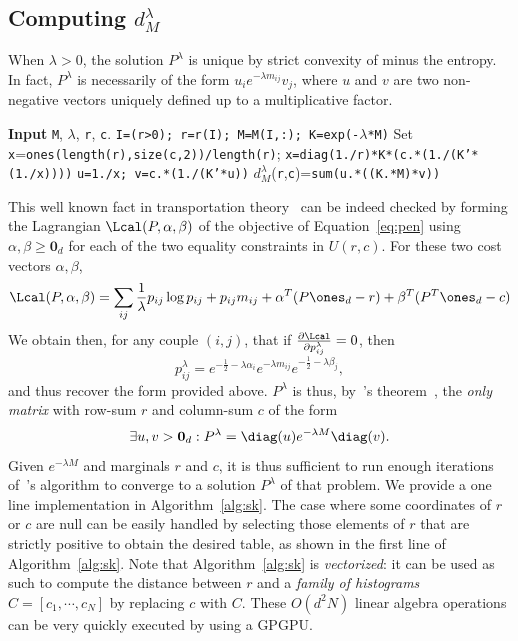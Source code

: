 \documentclass{amsart} %
\begin{document}
\subsection{Computing $d_{M}^\lambda$} When $\lambda>0$, the solution $P^\lambda$ is unique by strict convexity of minus the entropy. In fact, $P^\lambda$ is necessarily of the form $u_i e^{-\lambda m_{ij}} v_j$, where $u$ and $v$ are two non-negative vectors uniquely defined up to a multiplicative factor. 
\begin{algorithm}[H]
        \begin{algorithmic}
	\caption{Computation of $d^\lambda_M(r,c)$ using Sinkhorn-Knopp's fixed point iteration}\label{alg:sk}
          \STATE \textbf{Input} \texttt{M}, $\lambda$, \texttt{r}, \texttt{c}.
		  \STATE \texttt{I=(r>0); r=r(I); M=M(I,:); \texttt{K=exp(-$\lambda$*M)}}
		  \STATE Set \texttt{x}=\texttt{ones(length(r),size(c,2))/length(r)};
		  \STATE \texttt{x=diag(1./r)*K*(c.*(1./(K'*(1./x))))}
		  \ENDWHILE
		  \STATE  \texttt{u=1./x;  v=c.*(1./(K'*u))}
		  \STATE $d_{M}^\lambda$(\texttt{r},\texttt{c})=\texttt{sum(u.*((K.*M)*v))}
        \end{algorithmic}
      \end{algorithm}    	
This well known fact in transportation theory~\citep{erlander1990gravity} can be indeed checked by forming the Lagrangian $\Lcal(P,\alpha,\beta)$ of the objective of Equation~\eqref{eq:pen} using $\alpha,\beta\geq \mathbf{0}_d$ for each of the two equality constraints in $U(r,c)$. For these two cost vectors $\alpha,\beta$,
$$\Lcal(P,\alpha,\beta)=\sum_{ij} \frac{1}{\lambda}p_{ij}\log p_{ij}+ p_{ij}m_{ij} + \alpha^T(P \ones_d-r) + \beta^T(P^T\ones_d-c)$$
We obtain then, for any couple $(i,j)$, that if $\frac{\partial \Lcal}{\partial p_{ij}^\lambda}=0$, then 
$$
p_{ij}^\lambda= e^{-\frac{1}{2}-\lambda \alpha_i} e^{-\lambda m_{ij}}e^{-\frac{1}{2}-\lambda \beta_j},
$$
and thus recover the form provided above. $P^\lambda$ is thus, by~\citeauthor{sinkhorn1967concerning}'s theorem~\citeyearpar{sinkhorn1967concerning}, the \emph{only matrix} with row-sum $r$ and column-sum $c$ of the form
\begin{equation}\label{eq:sinkhorn}\exists u,v>\mathbf{0}_d : P^\lambda = \diag(u) e^{-\lambda M} \diag(v).\end{equation}
Given $e^{-\lambda M}$ and marginals $r$ and $c$, it is thus sufficient to run enough iterations of~\citeauthor{sinkhorn1967concerning}'s algorithm to converge to a solution $P^\lambda$ of that problem. We provide a one line implementation in Algorithm~\ref{alg:sk}. The case where some coordinates of $r$ or $c$ are null can be easily handled by selecting those elements of $r$ that are strictly positive to obtain the desired table, as shown in the first line of Algorithm~\ref{alg:sk}. Note that Algorithm~\ref{alg:sk} is \emph{vectorized}: it can be used as such to compute the distance between $r$ and a \emph{family of histograms} $C=[c_1,\cdots,c_N]$ by replacing $c$ with $C$. These $O(d^2N)$ linear algebra operations can be very quickly executed by using a GPGPU. 
\end{document}
